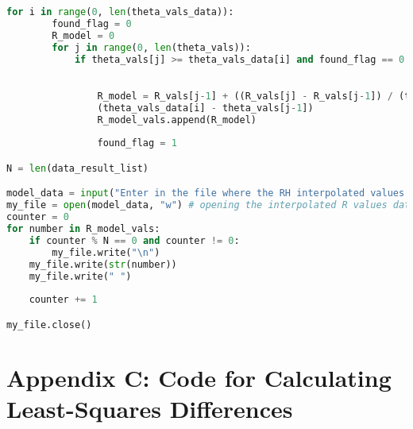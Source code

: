 \documentclass{article}
\begin{document}
\begin{footnotesize}
\begin{lstlisting}[language=Python]
    for i in range(0, len(theta_vals_data)):
        found_flag = 0
        R_model = 0
        for j in range(0, len(theta_vals)):
            if theta_vals[j] >= theta_vals_data[i] and found_flag == 0:
              

                R_model = R_vals[j-1] + ((R_vals[j] - R_vals[j-1]) / (theta_vals[j] - theta_vals[j-1])) * \
                (theta_vals_data[i] - theta_vals[j-1])
                R_model_vals.append(R_model)
               
                found_flag = 1

N = len(data_result_list)

model_data = input("Enter in the file where the RH interpolated values should be stored: ")
my_file = open(model_data, "w") # opening the interpolated R values data file e.g. 'test_model.dat'
counter = 0
for number in R_model_vals:
    if counter % N == 0 and counter != 0:
        my_file.write("\n")
    my_file.write(str(number))
    my_file.write(" ")
    
    counter += 1

my_file.close() 

\end{lstlisting}
\end{footnotesize}

\section*{Appendix C: Code for Calculating Least-Squares Differences}
\label{app:appendix_C}
\end{document}
